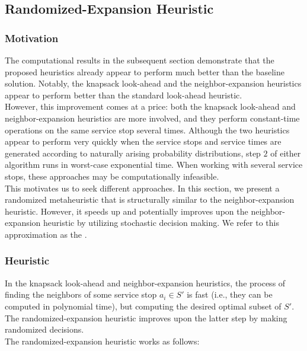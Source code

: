 \documentclass[12pt]{scrartcl}
\begin{document}
\subsection{Randomized-Expansion Heuristic}
\subsubsection{Motivation}
The computational results in the subsequent section demonstrate that the proposed heuristics already appear to perform much better than the baseline solution. Notably, the knapsack look-ahead and the neighbor-expansion heuristics appear to perform better than the standard look-ahead heuristic. \\

However, this improvement comes at a price: both the knapsack look-ahead and neighbor-expansion heuristics are more involved, and they perform constant-time operations on the same service stop several times. Although the two heuristics appear to perform very quickly when the service stops and service times are generated according to naturally arising probability distributions, step $2$ of either algorithm runs in worst-case exponential time. When working with several service stops, these approaches may be computationally infeasible. \\

This motivates us to seek different approaches. In this section, we present a randomized metaheuristic that is structurally similar to the neighbor-expansion heuristic. However, it speeds up and potentially improves upon the neighbor-expansion heuristic by utilizing stochastic decision making. We refer to this approximation as the . 


\subsubsection{Heuristic}

In the knapsack look-ahead and neighbor-expansion heuristics, the process of finding the neighbors of some service stop $a_i \in S'$ is fast (i.e., they can be computed in polynomial time), but computing the desired optimal subset of $S'$. The randomized-expansion heuristic improves upon the latter step by making randomized decisions. \\

The randomized-expansion heuristic works as follows:
\end{document}
